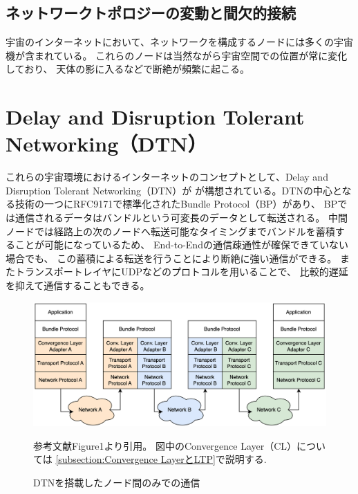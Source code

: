 \subsection{ネットワークトポロジーの変動と間欠的接続}
\label{subsection:ネットワークトポロジーの変動と間欠的接続}
宇宙のインターネットにおいて、ネットワークを構成するノードには多くの宇宙機が含まれている。
これらのノードは当然ながら宇宙空間での位置が常に変化しており、
 天体の影に入るなどで断絶が頻繁に起こる。 

\section{Delay and Disruption Tolerant Networking（DTN）}
これらの宇宙環境におけるインターネットのコンセプトとして、Delay and Disruption Tolerant Networking（DTN）が
が構想されている。DTNの中心となる技術の一つにRFC9171\cite{rfc9171}で標準化されたBundle Protocol（BP）があり、 
BPでは通信されるデータはバンドルという可変長のデータとして転送される。 
中間ノードでは経路上の次のノードへ転送可能なタイミングまでバンドルを蓄積することが可能になっているため、 
End-to-Endの通信疎通性が確保できていない場合でも、 この蓄積による転送を行うことにより断絶に強い通信ができる。
またトランスポートレイヤにUDPなどのプロトコルを用いることで、 比較的遅延を抑えて通信することもできる。\cite{bundle_protocol_architecture}

\begin{figure}[tbh]
    \centering
    \includegraphics[width=0.7\textheight]{img/dtnprotocolstack.pdf}
    \caption{DTNを搭載したノード間のみでの通信}
    \label{fig:dtnprotocolstack}
    \begin{minipage}{\textwidth}
        \raggedright
        \vspace{3mm}
        参考文献\cite{bundle_protocol_architecture}Figure1より引用。
        図中のConvergence Layer（CL）については
        \ref{subsection:Convergence LayerとLTP}で説明する.
    \end{minipage}
\end{figure}

